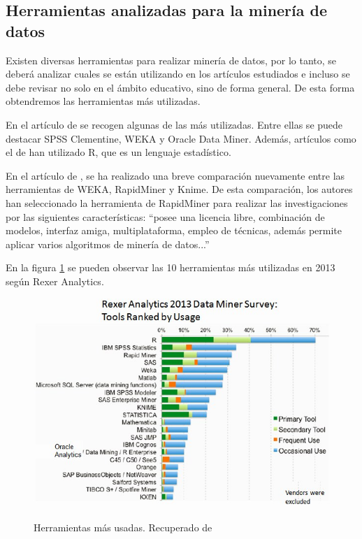 \subsection{Herramientas analizadas para la minería de datos}
Existen diversas herramientas para realizar minería de datos, por lo tanto, se deberá analizar cuales se están utilizando en los artículos estudiados e incluso se debe revisar no solo en el ámbito educativo, sino de forma general. De esta forma obtendremos las herramientas más utilizadas.

En el artículo de  se recogen algunas de las más utilizadas. Entre ellas se puede destacar SPSS Clementine, WEKA y Oracle Data Miner. Además, artículos como el de  han utilizado R, que es un lenguaje estadístico.

En el artículo de , se ha realizado una breve comparación nuevamente entre las herramientas de WEKA, RapidMiner y Knime. De esta comparación, los autores han seleccionado la herramienta de RapidMiner para realizar las investigaciones por las siguientes características: ``posee una licencia libre, combinación de modelos, interfaz amiga, multiplataforma, empleo de técnicas, además permite aplicar varios algoritmos de minería de datos...'' \cite{jaramillo2015aplicacion}

En la figura \ref{fig:top10tools} se pueden observar las 10 herramientas más utilizadas en 2013 según Rexer Analytics. \cite{rexer2013}

\begin{figure}[htb]
	\centering
	\caption{Herramientas más usadas. Recuperado de \protect\cite{rexer2013}}
	\includegraphics[width=1\textwidth]{recursos/top10tools}
	\label{fig:top10tools}
\end{figure}
\FloatBarrier

